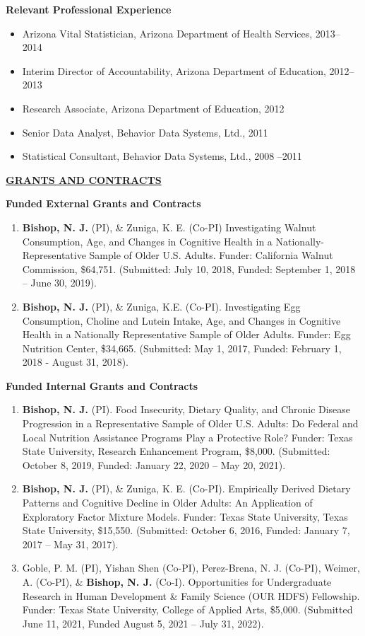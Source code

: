 \documentclass[
]{article}
\begin{document}
\textbf{Relevant Professional Experience}

\begin{itemize}
\item
  Arizona Vital Statistician, Arizona Department of Health Services,
  2013-- 2014
\item
  Interim Director of Accountability, Arizona Department of Education,
  2012-- 2013
\item
  Research Associate, Arizona Department of Education, 2012
\item
  Senior Data Analyst, Behavior Data Systems, Ltd., 2011
\item
  Statistical Consultant, Behavior Data Systems, Ltd., 2008 --2011
\end{itemize}

\uline{\textbf{GRANTS AND CONTRACTS}}

\textbf{Funded External Grants and Contracts}

\begin{enumerate}
\def\labelenumi{\arabic{enumi}.}
\item
  \textbf{Bishop, N. J.} (PI), \& Zuniga, K. E. (Co-PI) Investigating
  Walnut Consumption, Age, and Changes in Cognitive Health in a
  Nationally-Representative Sample of Older U.S. Adults. Funder:
  California Walnut Commission, \$64,751. (Submitted: July 10, 2018,
  Funded: September 1, 2018 -- June 30, 2019).
\item
  \textbf{Bishop, N. J.} (PI), \& Zuniga, K.E. (Co-PI). Investigating
  Egg Consumption, Choline and Lutein Intake, Age, and Changes in
  Cognitive Health in a Nationally Representative Sample of Older
  Adults. Funder: Egg Nutrition Center, \$34,665. (Submitted: May 1,
  2017, Funded: February 1, 2018 - August 31, 2018).
\end{enumerate}

\textbf{Funded Internal Grants and Contracts}

\begin{enumerate}
\def\labelenumi{\arabic{enumi}.}
\item
  \textbf{Bishop, N. J.} (PI). Food Insecurity, Dietary Quality, and
  Chronic Disease Progression in a Representative Sample of Older U.S.
  Adults: Do Federal and Local Nutrition Assistance Programs Play a
  Protective Role? Funder: Texas State University, Research Enhancement
  Program, \$8,000. (Submitted: October 8, 2019, Funded: January 22,
  2020 -- May 20, 2021).
\item
  \textbf{Bishop, N. J.} (PI), \& Zuniga, K. E. (Co-PI). Empirically
  Derived Dietary Patterns and Cognitive Decline in Older Adults: An
  Application of Exploratory Factor Mixture Models. Funder: Texas State
  University, Texas State University, \$15,550. (Submitted: October 6,
  2016, Funded: January 7, 2017 -- May 31, 2017).
\item
  Goble, P. M. (PI), Yishan Shen (Co-PI), Perez-Brena, N. J. (Co-PI),
  Weimer, A. (Co-PI), \& \textbf{Bishop, N. J.} (Co-I). Opportunities
  for Undergraduate Research in Human Development \& Family Science (OUR
  HDFS) Fellowship. Funder: Texas State University, College of Applied
  Arts, \$5,000. (Submitted June 11, 2021, Funded August 5, 2021 -- July
  31, 2022).
\end{enumerate}
\end{document}
